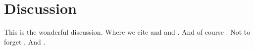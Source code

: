 
\section{Discussion}
This is the wonderful discussion. Where we cite \cite{source1} and \cite{source2} and \cite{source3}. And of course \cite{source4}. Not to forget \cite{labdesc}. And \cite{source5}.

